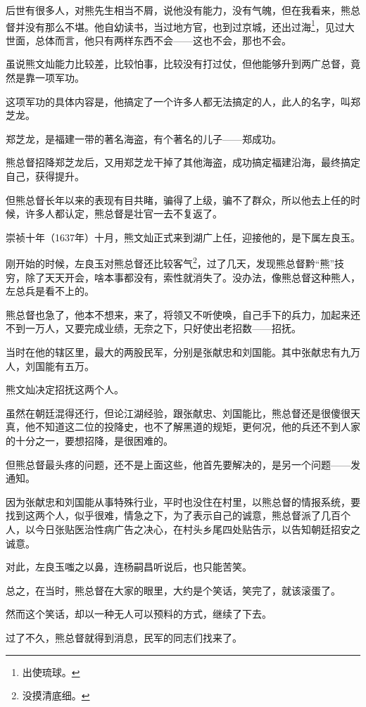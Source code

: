 \begin{multicols}{\theparacolNo}
		后世有很多人，对熊先生相当不屑，说他没有能力，没有气魄，但在我看来，熊总督并没有那么不堪。他自幼读书，当过地方官，也到过京城，还出过海\footnote{出使琉球。}，见过大世面，总体而言，他只有两样东西不会——这也不会，那也不会。

		虽说熊文灿能力比较差，比较怕事，比较没有打过仗，但他能够升到两广总督，竟然是靠一项军功。

		这项军功的具体内容是，他搞定了一个许多人都无法搞定的人，此人的名字，叫郑芝龙。

		郑芝龙，是福建一带的著名海盗，有个著名的儿子——郑成功。

		熊总督招降郑芝龙后，又用郑芝龙干掉了其他海盗，成功搞定福建沿海，最终搞定自己，获得提升。

		但熊总督长年以来的表现有目共睹，骗得了上级，骗不了群众，所以他去上任的时候，许多人都认定，熊总督是壮官一去不复返了。

		崇祯十年（1637年）十月，熊文灿正式来到湖广上任，迎接他的，是下属左良玉。

		刚开始的时候，左良玉对熊总督还比较客气\footnote{没摸清底细。}，过了几天，发现熊总督黔“熊”技穷，除了天天开会，啥本事都没有，索性就消失了。没办法，像熊总督这种熊人，左总兵是看不上的。

		熊总督也急了，他本不想来，来了，将领又不听使唤，自己手下的兵力，加起来还不到一万人，又要完成业绩，无奈之下，只好使出老招数——招抚。

		当时在他的辖区里，最大的两股民军，分别是张献忠和刘国能。其中张献忠有九万人，刘国能有五万。

		熊文灿决定招抚这两个人。

		虽然在朝廷混得还行，但论江湖经验，跟张献忠、刘国能比，熊总督还是很傻很天真，他不知道这二位的投降史，也不了解黑道的规矩，更何况，他的兵还不到人家的十分之一，要想招降，是很困难的。

		但熊总督最头疼的问题，还不是上面这些，他首先要解决的，是另一个问题——发通知。

		因为张献忠和刘国能从事特殊行业，平时也没住在村里，以熊总督的情报系统，要找到这两个人，似乎很难，情急之下，为了表示自己的诚意，熊总督派了几百个人，以今日张贴医治性病广告之决心，在村头乡尾四处贴告示，以告知朝廷招安之诚意。

		对此，左良玉嗤之以鼻，连杨嗣昌听说后，也只能苦笑。

		总之，在当时，熊总督在大家的眼里，大约是个笑话，笑完了，就该滚蛋了。

		然而这个笑话，却以一种无人可以预料的方式，继续了下去。

		过了不久，熊总督就得到消息，民军的同志们找来了。


\end{multicols}
